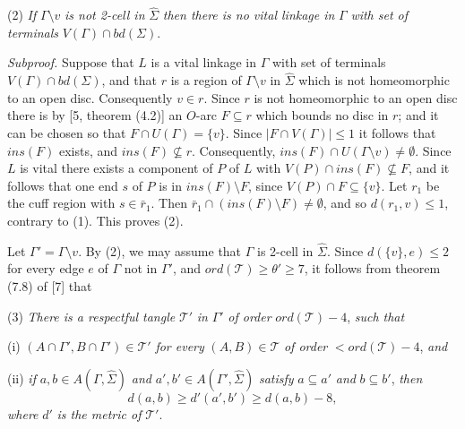\hspace*{12pt}(2) \textit{If} $\Gamma \setminus v$ \textit{is not 2-cell in} $\hat{\Sigma}$ \textit{then there is no vital linkage in} $\Gamma$ \textit{with set of terminals} $V(\Gamma) \cap bd(\Sigma)$.

\textit{Subproof.} Suppose that $L$ is a vital linkage in $\Gamma$ with set of terminals $V(\Gamma) \cap bd(\Sigma)$, and that $r$ is a region of $\Gamma \setminus v$ in $\hat{\Sigma}$ which is not homeomorphic to an open disc. Consequently $v \in r$. Since $r$ is not homeomorphic to an open disc there is by [5, theorem (4.2)] an $O$-arc $F \subseteq r$ which bounds no disc in $r$; and it can be chosen so that $F \cap U(\Gamma) = \{v\}$. Since $|F \cap V(\Gamma)| \le 1$ it follows that $ins(F)$ exists, and $ins(F) \not\subseteq r$. Consequently, $ins(F) \cap U(\Gamma \setminus v) \ne \emptyset$. Since $L$ is vital there exists a component of $P$ of $L$ with $V(P) \cap ins(F) \not\subseteq F$, and it follows that one end $s$ of $P$ is in $ins(F) \setminus F$, since $V(P) \cap F \subseteq \{v\}$. Let $r_1$ be the cuff region with $s \in \bar{r}_1$. Then $\bar{r}_1 \cap (ins(F) \setminus F) \ne \emptyset$, and so $d(r_1, v) \le 1$, contrary to (1). This proves (2).

Let $\Gamma' = \Gamma \setminus v$. By (2), we may assume that $\Gamma$ is 2-cell in $\hat{\Sigma}$. Since $d(\{v\}, e) \le 2$ for every edge $e$ of $\Gamma$ not in $\Gamma'$, and $ord(\mathcal{T}) \ge \theta' \ge 7$, it follows from theorem (7.8) of [7] that

\hspace*{12pt}(3) \textit{There is a respectful tangle} $\mathcal{T}'$ \textit{in} $\Gamma'$ \textit{of order} $ord(\mathcal{T}) - 4$, \textit{such that}

\hspace*{12pt}(i) $(A \cap \Gamma', B \cap \Gamma') \in \mathcal{T}'$ \textit{for every} $(A, B) \in \mathcal{T}$ \textit{of order} $< ord(\mathcal{T}) - 4$, \textit{and}

\hspace*{12pt}(ii) \textit{if} $a, b \in A(\Gamma, \hat{\Sigma})$ \textit{and} $a', b' \in A(\Gamma', \hat{\Sigma})$ \textit{satisfy} $a \subseteq a'$ \textit{and} $b \subseteq b'$, \textit{then}
\begin{equation*}
d(a, b) \ge d'(a', b') \ge d(a, b) - 8,
\end{equation*}
\textit{where} $d'$ \textit{is the metric of} $\mathcal{T}'$.


